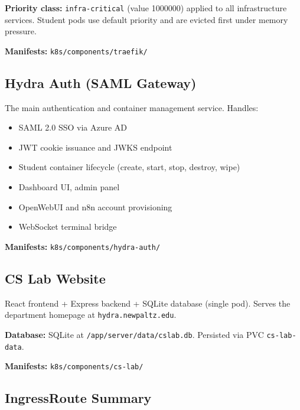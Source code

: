 \documentclass[11pt,a4paper]{article}
\begin{document}
\textbf{Priority class:} \texttt{infra-critical} (value 1000000) applied to all infrastructure services. Student pods use default priority and are evicted first under memory pressure.

\textbf{Manifests:} \texttt{k8s/components/traefik/}

\subsection{Hydra Auth (SAML Gateway)}

The main authentication and container management service. Handles:
\begin{itemize}[nosep]
    \item SAML 2.0 SSO via Azure AD
    \item JWT cookie issuance and JWKS endpoint
    \item Student container lifecycle (create, start, stop, destroy, wipe)
    \item Dashboard UI, admin panel
    \item OpenWebUI and n8n account provisioning
    \item WebSocket terminal bridge
\end{itemize}

\textbf{Manifests:} \texttt{k8s/components/hydra-auth/}

\subsection{CS Lab Website}

React frontend + Express backend + SQLite database (single pod). Serves the department homepage at \texttt{hydra.newpaltz.edu}.

\textbf{Database:} SQLite at \texttt{/app/server/data/cslab.db}. Persisted via PVC \texttt{cs-lab-data}.

\textbf{Manifests:} \texttt{k8s/components/cs-lab/}

\subsection{IngressRoute Summary}
\end{document}
